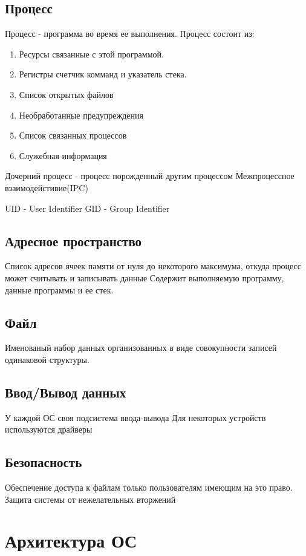 \documentclass[a4paper]{article}
\begin{document}
\subsection{Процесс}
Процесс - программа во время ее выполнения. 
Процесс состоит из: 
\begin{enumerate}
\item Ресурсы связанные с этой программой. 
\item Регистры счетчик комманд и указатель стека.
\item Список открытых файлов
\item Необработанные предупреждения
\item Список связанных процессов
\item Служебная информация
\end{enumerate}

Дочерний процесс - процесс порожденный другим процессом
Межпроцессное взаимодейстивие(IPC)

UID - User Identifier
GID - Group Identifier

\subsection{Адресное пространство}
Список адресов ячеек памяти от нуля до некоторого максимума, откуда процесс может считывать и записывать данные 
Содержит выполняемую программу, данные программы и ее стек.

\subsection{Файл}
Именованый набор данных организованных в виде совокупности записей одинаковой структуры.

\subsection{Ввод/Вывод данных}
У каждой ОС своя подсистема ввода-вывода
Для некоторых устройств используются драйверы

\subsection{Безопасность}
Обеспечение доступа к файлам только пользователям имеющим на это право. Защита системы от нежелательных вторжений

\section{Архитектура ОС}
\end{document}
